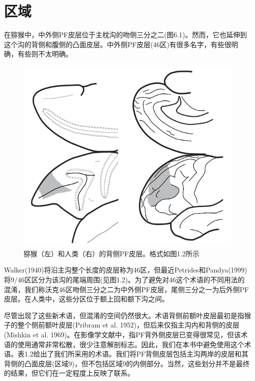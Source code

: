 \section{区域}
在猕猴中，中外侧PF皮层位于主枕沟的吻侧三分之二(图6.1)。然而，它也延伸到这个沟的背侧和腹侧的凸面皮层。中外侧PF皮层(46区)有很多名字，有些很明确，有些则不太明确。
\begin{figure}
	\centering
	\includegraphics[width=0.7\linewidth]{image_pfc/Fig_6_1}
	\caption{猕猴（左）和人类（右）的背侧PF皮层。格式如图1.2所示}
	\label{fig:fig}
\end{figure}

Walker(1940)将沿主沟整个长度的皮层称为46区，但最近Petrides和Pandya(1999)将9/46区区分为该沟的尾端周围(见图1.2)。为了避免对46这个术语的不同用法的混淆，我们称沃克46区吻侧三分之二为中外侧PF皮层，尾侧三分之一为后外侧PF皮层。在人类中，这些分区位于额上回和额下沟之间。

尽管出现了这些新术语，但混淆的空间仍然很大。术语背侧前额叶皮层最初是指猴子的整个侧前额叶皮层(Pribram et al. 1952)，但后来仅指主沟内和背侧的皮层(Mishkin et al. 1969)。在影像学文献中，指PF背外侧皮层已变得很常见，但该术语的使用通常非常松散，很少注意解剖标志。因此，我们在本书中避免使用这个术语。表1.2给出了我们所采用的术语。我们将PF背侧皮层包括主沟两岸的皮层和其背侧的凸面皮层(区域9)，但不包括区域9的内侧部分。当然，这些划分并不是最终的结果，但它们在一定程度上反映了联系。
